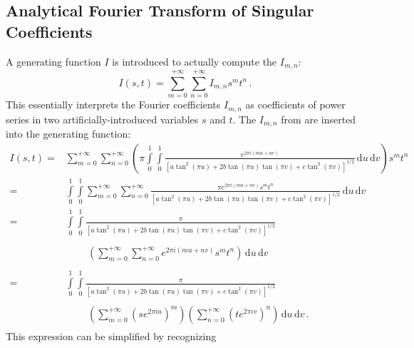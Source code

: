 \FloatBarrier
\subsection{Analytical Fourier Transform of Singular Coefficients}
A generating function $I$ is introduced to actually compute the $I_{m,n}$:
\begin{equation}
  I(s,t) = \sum\limits_{m=0}^{+\infty}
      \sum\limits_{n=0}^{+\infty}
        I_{m,n} s^m t^n \label{eqn:I_gf} \, .
\end{equation}
This essentially interprets the Fourier coefficients $I_{m,n}$
as coefficients of power series in two artificially-introduced variables $s$ and $t$.
The $I_{m,n}$ from  are inserted into the generating function:
\begin{align}
  I(s,t)
  =& \sum\limits_{m=0}^{+\infty}
     \sum\limits_{n=0}^{+\infty}
       \left(
         \pi \int\limits_0^1 \int\limits_0^1
         \frac{e^{2 \pi i (m u + n v)}}
              {\left[ a \tan^2(\pi u) + 2 b \tan(\pi u) \tan(\pi v) + c \tan^2(\pi v) \right]^{1/2}}
         \,\mathrm{d}u \,\mathrm{d}v
       \right)
       s^m t^n \\
  =& \int\limits_0^1 \int\limits_0^1
       \sum\limits_{m=0}^{+\infty}
       \sum\limits_{n=0}^{+\infty}
         \frac{\pi e^{2 \pi i (m u + n v)} s^m t^n}
              {\left[ a \tan^2(\pi u) + 2 b \tan(\pi u) \tan(\pi v) + c \tan^2(\pi v) \right]^{1/2}}
         \,\mathrm{d}u \,\mathrm{d}v \\
  =& \int\limits_0^1 \int\limits_0^1
       \frac{\pi}
            {\left[ a \tan^2(\pi u) + 2 b \tan(\pi u) \tan(\pi v) + c \tan^2(\pi v) \right]^{1/2}} \nonumber \\
  ~& \phantom{\int\limits_0^1 \int\limits_0^1}~
     \left(
         \sum\limits_{m=0}^{+\infty}
         \sum\limits_{n=0}^{+\infty}
           e^{2 \pi i (m u + n v)} s^m t^n
       \right)
       \,\mathrm{d}u \,\mathrm{d}v \\
  =& \int\limits_0^1 \int\limits_0^1
       \frac{\pi}
            {\left[ a \tan^2(\pi u) + 2 b \tan(\pi u) \tan(\pi v) + c \tan^2(\pi v) \right]^{1/2}} \nonumber \\
  ~& \phantom{\int\limits_0^1 \int\limits_0^1}~
     \left( \sum\limits_{m=0}^{+\infty} \left( s e^{2 \pi i u} \right)^m \right)
     \left( \sum\limits_{n=0}^{+\infty} \left( t e^{2 \pi i v} \right)^n \right)
     \,\mathrm{d}u \,\mathrm{d}v \, . \label{eqn:def_I}
\end{align}
This expression can be simplified by recognizing
